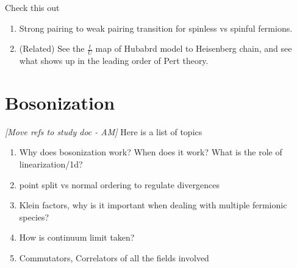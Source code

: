 \documentclass{article}
\newcommand\AM[1]{{\it \color{darkblue}  [#1 - AM]}}
\begin{document}
Check this out \cite{verresen2017one}
\begin{enumerate}
    \item Strong pairing to weak pairing transition for spinless vs spinful fermions.
    \item (Related) See the $\frac{t}{U}$ map of Hubabrd model to Heisenberg chain, and see what shows up in the leading order of Pert theory.
\end{enumerate}
\section{Bosonization}
\AM{Move refs to study doc}
Here is a list of topics
\begin{enumerate}
    \item Why does bosonization work? When does it work? What is the role of linearization/1d?
    \item point split vs normal ordering to regulate divergences
    \item Klein factors, why is it important when dealing with multiple fermionic species?
    \item How is continuum limit taken?
    \item Commutators, Correlators of all the fields involved
\end{enumerate}
\end{document}
